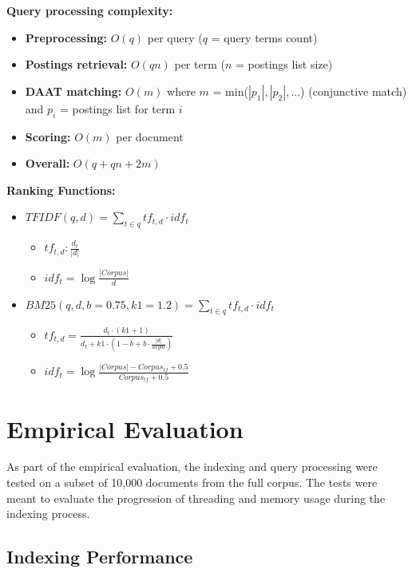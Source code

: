 \textbf{Query processing complexity:}

\begin{itemize}
  \item \textbf{Preprocessing:} $O(q)$ per query ($q$ = query terms count)
  \item \textbf{Postings retrieval:} $O(q n)$ per term ($n$ = postings list size)
  \item \textbf{DAAT matching:} $O(m)$ where $m$ = min($|p_1|, |p_2|, ...$) (conjunctive match) and $p_i$ = postings list for term $i$
  \item \textbf{Scoring:} $O(m)$ per document
  \item \textbf{Overall:} $O(q + qn + 2m)$
\end{itemize}

\textbf{Ranking Functions:}

\begin{itemize}
  \item $TFIDF(q, d) = \sum_{t \in q} tf_{t,d} \cdot idf_t$ \label{eq:tfidf}
        \begin{itemize}
          \item $tf_{t,d}: \frac{d_t}{|d|}$
          \item $idf_t = \log{\frac{|Corpus|}{d}}$
        \end{itemize}
  \item $BM25(q, d, b=0.75, k1=1.2) = \sum_{t \in q} tf_{t,d} \cdot idf_t$ \label{eq:bm25}
        \begin{itemize}
          \item $tf_{t,d} = \frac{d_t \cdot (k1+1)}{d_t + k1 \cdot (1-b+b \cdot \frac{|d|}{avgdl})}$
          \item $idf_t = \log{\frac{|Corpus| - Corpus_{tf} + 0.5}{Corpus_{tf} + 0.5}}$
        \end{itemize}
\end{itemize}

\section{Empirical Evaluation}

As part of the empirical evaluation, the indexing and query processing were tested on a subset of 10,000 documents from the full corpus. The tests were meant to evaluate the progression of threading and memory usage during the indexing process.

\subsection{Indexing Performance}

